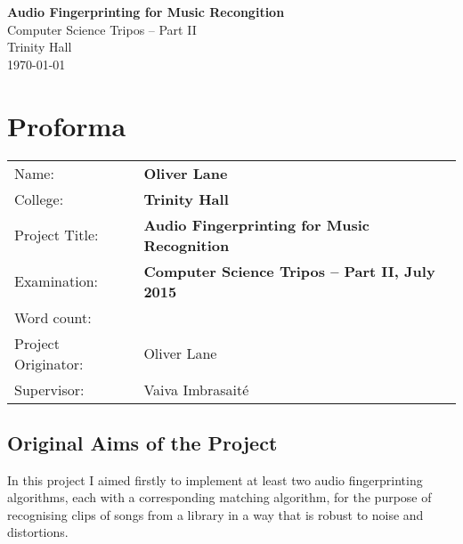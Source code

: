\documentclass[12pt,a4paper,twoside,openright]{report}
\begin{document}





\pagestyle{empty}


\vspace*{60mm}
\begin{center}
\Huge
\textbf{Audio Fingerprinting for Music Recongition} \\[5mm]
Computer Science Tripos -- Part II \\[5mm]
Trinity Hall \\[5mm]
\today  %
\end{center}


\pagestyle{plain}

\chapter*{Proforma}

{\large
\begin{tabular}{ll}
Name:               & \bf Oliver Lane                       \\
College:            & \bf Trinity Hall                     \\
Project Title:      & \bf Audio Fingerprinting for Music Recognition \\
Examination:        & \bf Computer Science Tripos -- Part II, July 2015  \\
Word count:         & \bf   \\
Project Originator: & Oliver Lane                    \\
Supervisor:         & Vaiva Imbrasait\'{e}                    \\ 
\end{tabular}
}


\section*{Original Aims of the Project}

In this project I aimed firstly to implement at least two audio fingerprinting algorithms, each with a corresponding matching algorithm, for the purpose of recognising clips of songs from a library in a way that is robust to noise and distortions.
\end{document}
